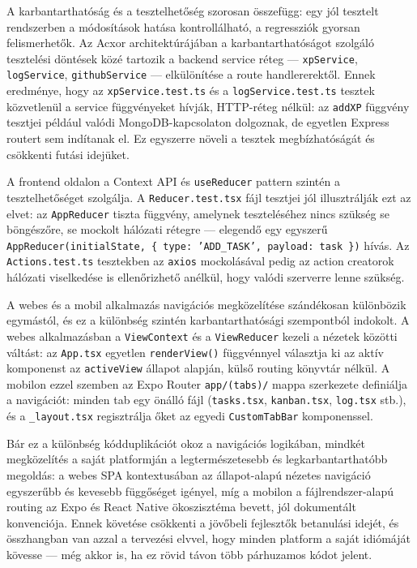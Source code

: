 
A karbantarthatóság és a tesztelhetőség szorosan összefügg: egy jól tesztelt
rendszerben a módosítások hatása kontrollálható, a regressziók gyorsan
felismerhetők. Az Acxor architektúrájában a karbantarthatóságot szolgáló
tesztelési döntések közé tartozik a backend service réteg — \texttt{xpService},
\texttt{logService}, \texttt{githubService} — elkülönítése a route
handlererektől. Ennek eredménye, hogy az \texttt{xpService.test.ts} és a
\texttt{logService.test.ts} tesztek közvetlenül a service függvényeket hívják,
HTTP-réteg nélkül: az \texttt{addXP} függvény tesztjei például valódi
MongoDB-kapcsolaton dolgoznak, de egyetlen Express routert sem indítanak el.
Ez egyszerre növeli a tesztek megbízhatóságát és csökkenti futási idejüket.

A frontend oldalon a Context API és \texttt{useReducer} pattern szintén a
tesztelhetőséget szolgálja. A \texttt{Reducer.test.tsx} fájl tesztjei jól
illusztrálják ezt az elvet: az \texttt{AppReducer} tiszta függvény, amelynek
teszteléséhez nincs szükség se böngészőre, se mockolt hálózati rétegre —
elegendő egy egyszerű \texttt{AppReducer(initialState, \{ type: 'ADD\_TASK',
payload: task \})} hívás. Az \texttt{Actions.test.ts} tesztekben az
\texttt{axios} mockolásával pedig az action creatorok hálózati viselkedése is
ellenőrizhető anélkül, hogy valódi szerverre lenne szükség.


A webes és a mobil alkalmazás navigációs megközelítése szándékosan különbözik
egymástól, és ez a különbség szintén karbantarthatósági szempontból indokolt.
A webes alkalmazásban a \texttt{ViewContext} és a \texttt{ViewReducer} kezeli a
nézetek közötti váltást: az \texttt{App.tsx} egyetlen \texttt{renderView()}
függvénnyel választja ki az aktív komponenst az \texttt{activeView} állapot
alapján, külső routing könyvtár nélkül. A mobilon ezzel szemben az Expo Router
\texttt{app/(tabs)/} mappa szerkezete definiálja a navigációt: minden tab egy
önálló fájl (\texttt{tasks.tsx}, \texttt{kanban.tsx}, \texttt{log.tsx} stb.),
és a \texttt{\_layout.tsx} regisztrálja őket az egyedi \texttt{CustomTabBar}
komponenssel.

Bár ez a különbség kódduplikációt okoz a navigációs logikában, mindkét
megközelítés a saját platformján a legtermészetesebb és legkarbantarthatóbb
megoldás: a webes SPA kontextusában az állapot-alapú nézetes navigáció egyszerűbb
és kevesebb függőséget igényel, míg a mobilon a fájlrendszer-alapú routing az
Expo és React Native ökoszisztéma bevett, jól dokumentált konvenciója. Ennek
követése csökkenti a jövőbeli fejlesztők betanulási idejét, és összhangban van
azzal a tervezési elvvel, hogy minden platform a saját idiómáját kövesse —
még akkor is, ha ez rövid távon több párhuzamos kódot jelent.

